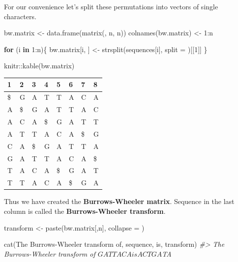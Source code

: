 \documentclass[
]{book}
\newenvironment{Shaded}{\begin{snugshade}}{\end{snugshade}}
\newcommand{\AttributeTok}[1]{\textcolor[rgb]{0.77,0.63,0.00}{#1}}
\newcommand{\CommentTok}[1]{\textcolor[rgb]{0.56,0.35,0.01}{\textit{#1}}}
\newcommand{\ControlFlowTok}[1]{\textcolor[rgb]{0.13,0.29,0.53}{\textbf{#1}}}
\newcommand{\DecValTok}[1]{\textcolor[rgb]{0.00,0.00,0.81}{#1}}
\newcommand{\FunctionTok}[1]{\textcolor[rgb]{0.00,0.00,0.00}{#1}}
\newcommand{\NormalTok}[1]{#1}
\newcommand{\OtherTok}[1]{\textcolor[rgb]{0.56,0.35,0.01}{#1}}
\newcommand{\SpecialCharTok}[1]{\textcolor[rgb]{0.00,0.00,0.00}{#1}}
\newcommand{\StringTok}[1]{\textcolor[rgb]{0.31,0.60,0.02}{#1}}
\begin{document}
For our convenience let's split these permutations into vectors of single characters.

\begin{Shaded}
\begin{Highlighting}[numbers=left,,]
\NormalTok{bw.matrix           }\OtherTok{\textless{}{-}} \FunctionTok{data.frame}\NormalTok{(}\FunctionTok{matrix}\NormalTok{(, n, n))}
\FunctionTok{colnames}\NormalTok{(bw.matrix) }\OtherTok{\textless{}{-}} \DecValTok{1}\SpecialCharTok{:}\NormalTok{n}

\ControlFlowTok{for}\NormalTok{ (i }\ControlFlowTok{in} \DecValTok{1}\SpecialCharTok{:}\NormalTok{n)\{}
\NormalTok{  bw.matrix[i, ] }\OtherTok{\textless{}{-}} \FunctionTok{strsplit}\NormalTok{(sequences[i], }\AttributeTok{split =} \StringTok{\textquotesingle{}\textquotesingle{}}\NormalTok{)[[}\DecValTok{1}\NormalTok{]]}
\NormalTok{\}}

\NormalTok{knitr}\SpecialCharTok{::}\FunctionTok{kable}\NormalTok{(bw.matrix)}
\end{Highlighting}
\end{Shaded}

\begin{tabular}{l|l|l|l|l|l|l|l}
\hline
1 & 2 & 3 & 4 & 5 & 6 & 7 & 8\\
\hline
\$ & G & A & T & T & A & C & A\\
\hline
A & \$ & G & A & T & T & A & C\\
\hline
A & C & A & \$ & G & A & T & T\\
\hline
A & T & T & A & C & A & \$ & G\\
\hline
C & A & \$ & G & A & T & T & A\\
\hline
G & A & T & T & A & C & A & \$\\
\hline
T & A & C & A & \$ & G & A & T\\
\hline
T & T & A & C & A & \$ & G & A\\
\hline
\end{tabular}

Thus we have created the \textbf{Burrows-Wheeler matrix}. Sequence in the last column is called the \textbf{Burrows-Wheeler transform}.

\begin{Shaded}
\begin{Highlighting}[numbers=left,,]
\NormalTok{transform }\OtherTok{\textless{}{-}} \FunctionTok{paste}\NormalTok{(bw.matrix[,n], }\AttributeTok{collapse =} \StringTok{\textquotesingle{}\textquotesingle{}}\NormalTok{)}

\FunctionTok{cat}\NormalTok{(}\StringTok{\textquotesingle{}The Burrows{-}Wheeler transform of\textquotesingle{}}\NormalTok{, }
\NormalTok{    sequence, }\StringTok{\textquotesingle{}is\textquotesingle{}}\NormalTok{, transform)}
\CommentTok{\#\textgreater{} The Burrows{-}Wheeler transform of $GATTACA is ACTGA$TA}
\end{Highlighting}
\end{Shaded}
\end{document}
